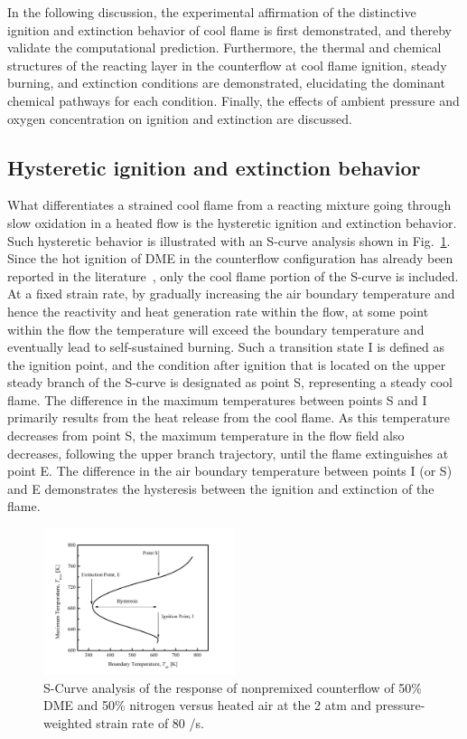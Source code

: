 \documentclass[review,3p,times]{elsarticle}
\begin{document}
In the following discussion, the experimental affirmation of the distinctive ignition and extinction behavior of cool flame is first demonstrated, and thereby validate the computational prediction.  Furthermore, the thermal and chemical structures of the reacting layer in the counterflow at cool flame ignition, steady burning, and extinction conditions are demonstrated, elucidating the dominant chemical pathways for each condition.  Finally, the effects of ambient pressure and oxygen concentration on ignition and extinction are discussed.

\subsection{Hysteretic ignition and extinction behavior}

What differentiates a strained cool flame from a reacting mixture going through slow oxidation in a heated flow is the hysteretic ignition and extinction behavior.  Such hysteretic behavior is illustrated with an S-curve analysis shown in Fig.~\ref{fig:S-curve}.  \textcolor{Rev1}{Since the hot ignition of DME in the counterflow configuration has already been reported in the literature~\cite{zheng05}, only the cool flame portion of the S-curve is included.}  At a fixed strain rate, by gradually increasing the air boundary temperature and hence the reactivity and heat generation rate within the flow, at some point within the flow the temperature will exceed the boundary temperature and eventually lead to self-sustained burning.  Such a transition state I is defined as the ignition point, and the condition after ignition that is located on the upper steady branch of the S-curve is designated as point S, representing a steady cool flame.  The difference in the maximum temperatures between points S and I primarily results from the heat release from the cool flame.  As this temperature decreases from point S, the maximum temperature in the flow field also decreases, following the upper branch trajectory, until the flame extinguishes at point E.  The difference in the air boundary temperature between points I (or S) and E demonstrates the hysteresis between the ignition and extinction of the flame. 

\begin{figure}[t]
  \centering
  \scriptsize
  \includegraphics[trim=6.5mm 7.5mm 7mm 8mm, clip=true, width=0.5\textwidth]{S-Curve.png}
  \normalsize
  \caption{S-Curve analysis of the response of nonpremixed counterflow of 50\% DME and 50\% nitrogen versus heated air at the 2 atm and pressure-weighted strain rate of 80 /s.}
  \label{fig:S-curve}
\end{figure}
\end{document}
